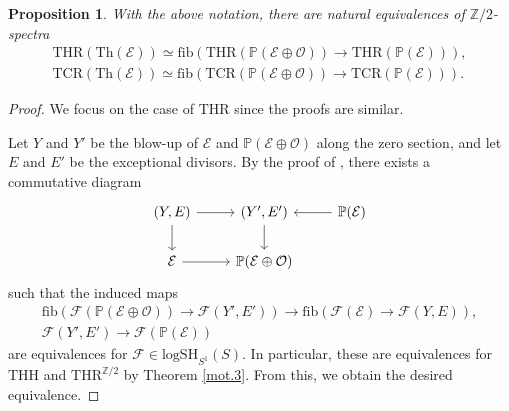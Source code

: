 \documentclass[10pt]{amsart}
\newtheorem{prop}[thm]{Proposition}
\theoremstyle{definition}
\theoremstyle{remark}
\numberwithin{equation}{section}
\renewcommand{\P}{\mathbb{P}}
\newcommand{\Z}{\mathbb{Z}}
\newcommand{\cE}{\mathcal{E}}
\newcommand{\cF}{\mathcal{F}}
\newcommand{\cO}{\mathcal{O}}
\newcommand{\fib}{\mathrm{fib}}
\newcommand{\logSH}{\mathrm{logSH}}
\newcommand{\Th}{\mathrm{Th}}
\newcommand{\THH}{\mathrm{THH}}
\newcommand{\THR}{\mathrm{THR}}
\newcommand{\TCR}{\mathrm{TCR}}
\newcommand{\Ztwo}{{\mathbb{Z}/2}}
\begin{document}
\begin{prop}
\label{mot.15}
With the above notation,
there are natural equivalences of $\Ztwo$-spectra
\begin{gather*}
\THR(\Th(\cE))
\simeq
\fib(
\THR(\P(\cE\oplus \cO))
\to
\THR(\P(\cE))),
\\
\TCR(\Th(\cE))
\simeq
\fib(
\TCR(\P(\cE\oplus \cO))
\to
\TCR(\P(\cE))).
\end{gather*}
\end{prop}
\begin{proof}
We focus on the case of $\THR$ since the proofs are similar.

Let $Y$ and $Y'$ be the blow-up of $\cE$ and $\P(\cE\oplus \cO)$ along the zero section,
and let $E$ and $E'$ be the exceptional divisors.
By the proof of \cite[Proposition 7.4.5]{logDM},
there exists a commutative diagram
\[
\begin{tikzcd}
(Y,E)\ar[d]\ar[r]&
(Y',E')\ar[d]\ar[r,leftarrow]&
\P(\cE)
\\
\cE\ar[r]&
\P(\cE\oplus \cO)
\end{tikzcd}
\]
such that the induced maps
\begin{gather*}
\fib(\cF(\P(\cE\oplus \cO))\to \cF(Y',E'))
\to
\fib(\cF(\cE)\to \cF(Y,E)),
\\
\cF(Y',E')
\to
\cF(\P(\cE))
\end{gather*}
are equivalences for $\cF\in \logSH_{S^1}(S)$.
In particular,
these are equivalences for $\THH$ and $\THR^{\Z/2}$ by Theorem \ref{mot.3}.
From this,
we obtain the desired equivalence.
\end{proof}
\end{document}
